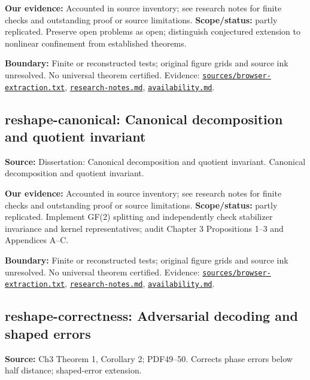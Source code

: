 \documentclass[11pt]{article}
\begin{document}
\textbf{Our evidence:} Accounted in source inventory; see research notes for finite checks and outstanding proof or source limitations. \textbf{Scope/status:} partly replicated. Preserve open problems as open; distinguish conjectured extension to nonlinear confinement from established theorems.

\textbf{Boundary:} Finite or reconstructed tests; original figure grids and source ink unresolved. No universal theorem certified. Evidence: \href{https://github.com/alectionary/vibe-math/blob/master/formalization/quintavalle-hgp/sources/browser-extraction.txt}{\nolinkurl{sources/browser-extraction.txt}}, \href{https://github.com/alectionary/vibe-math/blob/master/formalization/quintavalle-hgp/research-notes.md}{\nolinkurl{research-notes.md}}, \href{https://github.com/alectionary/vibe-math/blob/master/formalization/quintavalle-hgp/availability.md}{\nolinkurl{availability.md}}.
\subsection{reshape-canonical: Canonical decomposition and quotient invariant}
\label{claim:reshape-canonical}
\textbf{Source:} Dissertation: Canonical decomposition and quotient invariant. Canonical decomposition and quotient invariant.

\textbf{Our evidence:} Accounted in source inventory; see research notes for finite checks and outstanding proof or source limitations. \textbf{Scope/status:} partly replicated. Implement GF(2) splitting and independently check stabilizer invariance and kernel representatives; audit Chapter 3 Propositions 1--3 and Appendices A--C.

\textbf{Boundary:} Finite or reconstructed tests; original figure grids and source ink unresolved. No universal theorem certified. Evidence: \href{https://github.com/alectionary/vibe-math/blob/master/formalization/quintavalle-hgp/sources/browser-extraction.txt}{\nolinkurl{sources/browser-extraction.txt}}, \href{https://github.com/alectionary/vibe-math/blob/master/formalization/quintavalle-hgp/research-notes.md}{\nolinkurl{research-notes.md}}, \href{https://github.com/alectionary/vibe-math/blob/master/formalization/quintavalle-hgp/availability.md}{\nolinkurl{availability.md}}.
\subsection{reshape-correctness: Adversarial decoding and shaped errors}
\label{claim:reshape-correctness}
\textbf{Source:} Ch3 Theorem 1, Corollary 2; PDF49--50. Corrects phase errors below half distance; shaped-error extension.
\end{document}
